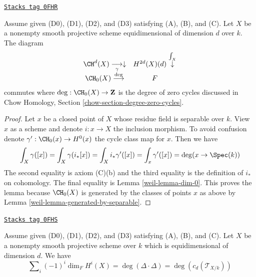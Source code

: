 \begin{lemma}
\label{weil-lemma-degrees-cycles}
\href{https://stacks.math.columbia.edu/tag/0FHR}{\texttt{Stacks tag 0FHR}}

Assume given (D0), (D1), (D2), and (D3) satisfying (A), (B), and (C).
Let $X$ be a nonempty smooth projective scheme
equidimensional of dimension $d$ over $k$. The diagram
$$
\begin{array}{cc}\CH^d(X) \underset{\gamma}{\longrightarrow}\downarrow & H^{2d}(X)(d) \overset{\int_X}{\downarrow} \\ \CH_0(X) \overset{\deg}{\longrightarrow} & F\end{array}
$$
commutes where $\deg : \CH_0(X) \to \mathbf{Z}$ is the degree of
zero cycles discussed in Chow Homology, Section
\ref{chow-section-degree-zero-cycles}.
\end{lemma}

\begin{proof}

Let $x$ be a closed point of $X$ whose residue field is separable
over $k$. View $x$ as a scheme and denote $i : x \to X$ the inclusion morphism.
To avoid confusion denote $\gamma' : \CH_0(x) \to H^0(x)$ the cycle class map
for $x$. Then we have
$$
\int_X \gamma([x]) = \int_X \gamma(i_*[x]) =
\int_X i_*\gamma'([x]) = \int_x \gamma'([x]) = \deg(x \to \Spec(k))
$$
The second equality is axiom (C)(b) and the third equality is
the definition of $i_*$ on cohomology. The final equality is
Lemma \ref{weil-lemma-dim-0}. This proves the lemma
because $\CH_0(X)$ is generated by the classes of points $x$ as above
by Lemma \ref{weil-lemma-generated-by-separable}.
\end{proof}

\begin{lemma}
\label{weil-lemma-square-diagonal}
\href{https://stacks.math.columbia.edu/tag/0FHS}{\texttt{Stacks tag 0FHS}}

Assume given (D0), (D1), (D2), and (D3) satisfying (A), (B), and (C).
Let $X$ be a nonempty smooth projective scheme over $k$ which is
equidimensional of dimension $d$. We have
$$
\sum\nolimits_i (-1)^i\dim_F H^i(X) =
\deg(\Delta \cdot \Delta) = \deg(c_d(\mathcal{T}_{X/k}))
$$
\end{lemma}

